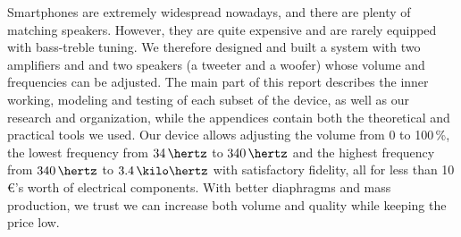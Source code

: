 \biabstract
{
%
%
    Smartphones are extremely widespread nowadays,
    and there are plenty of matching speakers.
    However, they are quite expensive and are rarely
    equipped with bass-treble tuning.
    We therefore designed and built a system with
    two amplifiers and and two speakers (a tweeter and a woofer)
    whose volume and frequencies can be adjusted.
    The main part of this report describes the inner working,
    modeling and testing of each subset of the device,
    as well as our research and organization, while
    the appendices contain both the theoretical and practical
    tools we used.
    Our device allows adjusting the volume from 0 to 100\,\%,
    the lowest frequency from $34\,\hertz$ to $340\,\hertz$ and
    the highest frequency from $340\,\hertz$ to $3.4\,\kilo\hertz$
    with satisfactory fidelity, all for less than 10\,\euro{}'s
    worth of electrical components.
    With better diaphragms and mass production, we trust we can
    increase both volume and quality while keeping
    the price low.
    \newline
}
